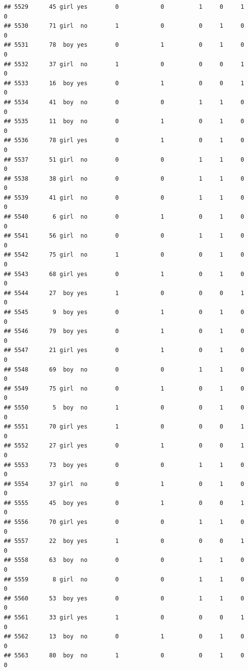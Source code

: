 \documentclass[man]{apa6}
\begin{document}
\begin{verbatim}
## 5529      45 girl yes        0            0          1     0     1     0
## 5530      71 girl  no        1            0          0     1     0     0
## 5531      78  boy yes        0            1          0     1     0     0
## 5532      37 girl  no        1            0          0     0     1     0
## 5533      16  boy yes        0            1          0     0     1     0
## 5534      41  boy  no        0            0          1     1     0     0
## 5535      11  boy  no        0            1          0     1     0     0
## 5536      78 girl yes        0            1          0     1     0     0
## 5537      51 girl  no        0            0          1     1     0     0
## 5538      38 girl  no        0            0          1     1     0     0
## 5539      41 girl  no        0            0          1     1     0     0
## 5540       6 girl  no        0            1          0     1     0     0
## 5541      56 girl  no        0            0          1     1     0     0
## 5542      75 girl  no        1            0          0     1     0     0
## 5543      68 girl yes        0            1          0     1     0     0
## 5544      27  boy yes        1            0          0     0     1     0
## 5545       9  boy yes        0            1          0     1     0     0
## 5546      79  boy yes        0            1          0     1     0     0
## 5547      21 girl yes        0            1          0     1     0     0
## 5548      69  boy  no        0            0          1     1     0     0
## 5549      75 girl  no        0            1          0     1     0     0
## 5550       5  boy  no        1            0          0     1     0     0
## 5551      70 girl yes        1            0          0     0     1     0
## 5552      27 girl yes        0            1          0     0     1     0
## 5553      73  boy yes        0            0          1     1     0     0
## 5554      37 girl  no        0            1          0     1     0     0
## 5555      45  boy yes        0            1          0     0     1     0
## 5556      70 girl yes        0            0          1     1     0     0
## 5557      22  boy yes        1            0          0     0     1     0
## 5558      63  boy  no        0            0          1     1     0     0
## 5559       8 girl  no        0            0          1     1     0     0
## 5560      53  boy yes        0            0          1     1     0     0
## 5561      33 girl yes        1            0          0     0     1     0
## 5562      13  boy  no        0            1          0     1     0     0
## 5563      80  boy  no        1            0          0     1     0     0

\end{verbatim}
\end{document}
